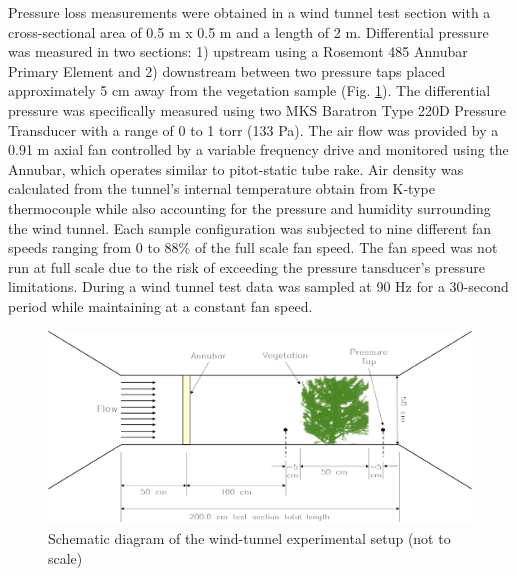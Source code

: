 \documentclass[12pt]{article}
\begin{document}
Pressure loss measurements were obtained in a wind tunnel test section with a cross-sectional area of 0.5 m x 0.5 m and a length of 2 \si{m}. Differential pressure was measured in two sections: 1) upstream using a Rosemont 485 Annubar Primary Element and 2) downstream between two pressure taps placed approximately 5 cm away from the vegetation sample  (Fig. \ref{fig:Windtun}). The differential pressure was specifically measured using two MKS Baratron Type 220D Pressure Transducer with a range of 0 to 1 torr (133 Pa). The air flow was provided by a 0.91 \si{m} axial fan controlled by a variable frequency drive and monitored using the Annubar, which operates similar to pitot-static tube rake. Air density was calculated from the tunnel's internal temperature obtain from K-type thermocouple while also accounting for the pressure and humidity surrounding the wind tunnel. Each sample configuration was subjected to nine different fan speeds ranging from 0 to 88\% of the full scale fan speed. The fan speed was not run at full scale due to the risk of exceeding the pressure tansducer's pressure limitations. During a wind tunnel test data was sampled at 90 Hz for a 30-second period while maintaining at a constant fan speed.\\

\begin{figure} [!ht]
	\centering 	\includegraphics[width=1.0\linewidth]{Picture6.jpg}
	\caption{Schematic diagram of the wind-tunnel experimental setup (not to scale)}
	\label{fig:Windtun}
\end{figure}
\end{document}
